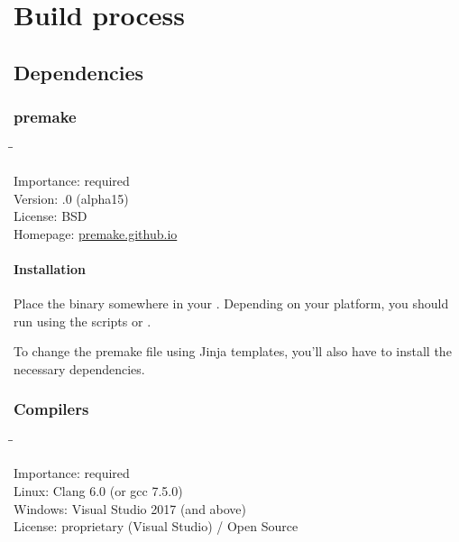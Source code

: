 \chapter{Build process}
\label{chap:build_process}

\section{Dependencies}
\label{sec:dependencies}

\subsection{premake}
\label{sec:dependencies_premake}

\begin{tabbing}
  \hspace*{6em}\=\=\kill

  Importance:  \> required \\
  Version:     .0 (alpha15) \\
  License:     \> BSD \\
  Homepage:    \> \href{https://premake.github.io/}{premake.github.io}
\end{tabbing}

\subsubsection{Installation}

Place the binary somewhere in your .  Depending on your
platform, you should run  using the scripts
 or
.

To change the premake file using Jinja templates, you'll also have to
install the necessary dependencies.

\subsection{Compilers}

\begin{tabbing}
  \hspace*{6em}\=\=\kill

  Importance:  \> required \\
  Linux:       \> Clang 6.0 (or gcc 7.5.0) \\
  Windows:     \> Visual Studio 2017 (and above) \\
  License:     \> proprietary (Visual Studio) / Open Source \\
\end{tabbing}

